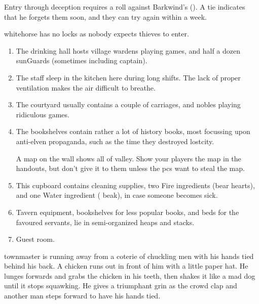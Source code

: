 \begin{multicols}{2}

Entry through deception requires a roll against Barkwind's  (\tn).
A tie indicates that he forgets them soon, and they can try again within a week.

\Gls{whitehorse} has no locks as nobody expects thieves to enter.
 
\begin{enumerate}
  \item
  The drinking hall hosts \gls{village} \glspl{warden} playing games, and half a dozen \glspl{sunGuard} (sometimes including \gls{captain}).
  \label{horseHall}
  \item
  \label{horseKitch}
  The staff sleep in the kitchen here during long shifts.
  The lack of proper ventilation makes the air difficult to breathe.
  \item
  \label{horseYard}
  The courtyard usually contains a couple of carriages, and nobles playing ridiculous games.
  \item
  \label{horseUpstairs}
  The bookshelves contain rather a lot of history books, most focussing upon anti-elven propaganda, such as the time they destroyed \gls{lostcity}.

  A map on the wall shows all of \gls{valley}.
  Show your players the map in the handouts, but don't give it to them unless the \glspl{pc} want to steal the map.
  \item
  \label{horseCupboard}
  This cupboard contains cleaning supplies, two Fire \glspl{ingredient} (bear hearts), and one Water \gls{ingredient} ( beak), in case someone becomes sick.
  \item
  \label{horseSideRoom}
  Tavern equipment, bookshelves for less popular books, and beds for the favoured servants, lie in semi-organized heaps and stacks.
  \item
  \label{wolfRoom}
  Guest room.
\end{enumerate}

\begin{boxtext}
  \Gls{townmaster} is running away from a coterie of chuckling men with his hands tied behind his back.
   A chicken runs out in front of him with a little paper hat.
   He lunges forwards and grabs the chicken in his teeth, then shakes it like a mad dog until it stops squawking.
   He gives a triumphant grin as the crowd clap and another man steps forward to have his hands tied.
\end{boxtext}


\end{multicols}

